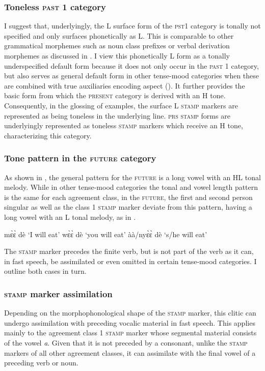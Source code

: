 \subsubsection*{Toneless \textsc{past 1} category} I suggest that, underlyingly, the L surface form of the \textsc{pst1} category is tonally not specified and only surfaces phonetically as L. This is comparable to other grammatical morphemes such as noun class prefixes or verbal derivation morphemes as discussed in . I view this phonetically L form as a tonally underspecified default form because it does not only occur in the \textsc{past 1} category, but also serves as general default form in other tense-mood categories when these are combined with true auxiliaries encoding aspect (). It further provides the basic form from which the \textsc{present} category is derived with an H tone. Consequently, in the glossing of examples, the surface L \textsc{stamp} markers are represented as being toneless in the underlying line. \textsc{prs} \textsc{stamp} forms are underlyingly represented as toneless \textsc{stamp} markers which receive an H tone, characterizing this category.


\subsubsection*{Tone pattern in the \textsc{future} category}
As shown in , the general pattern for the \textsc{future} is a long vowel with an HL tonal melody. While in other tense-mood categories the tonal and vowel length pattern is the same for each agreement class, in the \textsc{future}, the first and second person singular as well as the class 1 \textsc{stamp} marker deviate from this pattern, having a long vowel with an L tonal melody, as in .

\ea \label{FUTexept}
  \ea  mɛ̀ɛ̀ dè `I will eat'
\ex wɛ̀ɛ̀ dè `you will eat'
\ex àà/nyɛ̀ɛ̀ dè `s/he will eat'
\z
\z




The \textsc{stamp} marker precedes the finite verb, but is not part of the verb as it can, in fast speech, be assimilated or even omitted in certain tense-mood categories. I outline both cases in turn.

\subsubsection*{\textsc{stamp} marker assimilation}
Depending on the morphophonological shape of the \textsc{stamp} marker, this clitic can undergo assimilation with preceding vocalic material in fast speech. This applies mainly to the agreement class 1 \textsc{stamp} marker whose segmental material consists of the vowel {\itshape a}. Given that it is not preceded by a consonant, unlike the \textsc{stamp} markers of all other agreement classes, it can assimilate with the final vowel of a preceding verb or noun.


